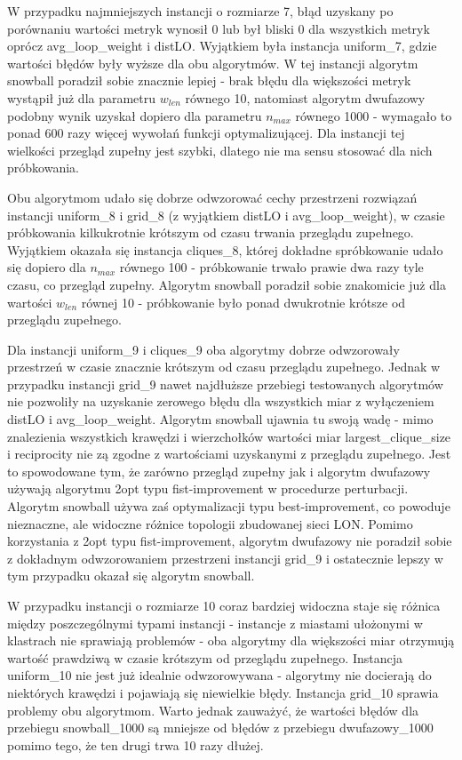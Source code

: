 W przypadku najmniejszych instancji o rozmiarze 7, błąd uzyskany po porównaniu wartości metryk
wynosił 0 lub był bliski 0 dla wszystkich metryk oprócz avg\_loop\_weight i distLO.
Wyjątkiem była instancja uniform\_7, gdzie wartości błędów były wyższe dla obu algorytmów.
W tej instancji algorytm snowball poradził sobie znacznie lepiej - brak błędu dla większości
metryk wystąpił już dla parametru $w_{len}$ równego 10, natomiast algorytm dwufazowy
podobny wynik uzyskał dopiero dla parametru $n_{max}$ równego 1000 - wymagało to ponad 600 razy więcej wywołań funkcji optymalizującej.
Dla instancji tej wielkości przegląd zupełny jest szybki, dlatego nie ma sensu stosować dla nich próbkowania.

Obu algorytmom udało się dobrze odwzorować cechy przestrzeni rozwiązań instancji uniform\_8 i grid\_8 (z wyjątkiem distLO i avg\_loop\_weight),
w czasie próbkowania kilkukrotnie krótszym od czasu trwania przeglądu zupełnego. Wyjątkiem okazała się instancja cliques\_8, której dokładne spróbkowanie
udało się dopiero dla $n_{max}$ równego 100 - próbkowanie trwało prawie dwa razy tyle czasu, co przegląd zupełny.
Algorytm snowball poradził sobie znakomicie już dla wartości $w_{len}$ równej 10 - próbkowanie było ponad dwukrotnie krótsze od przeglądu zupełnego.

Dla instancji uniform\_9 i cliques\_9 oba algorytmy dobrze odwzorowały przestrzeń w czasie znacznie krótszym od czasu przeglądu zupełnego.
Jednak w przypadku instancji grid\_9 nawet najdłuższe przebiegi testowanych algorytmów nie pozwoliły na uzyskanie zerowego błędu dla wszystkich
miar z wyłączeniem distLO i avg\_loop\_weight.
Algorytm snowball ujawnia tu swoją wadę - mimo znalezienia wszystkich krawędzi i wierzchołków wartości miar largest\_clique\_size i reciprocity
nie zą zgodne z wartościami uzyskanymi z przeglądu zupełnego. Jest to spowodowane tym, że zarówno przegląd zupełny jak i algorytm dwufazowy używają
algorytmu 2opt typu fist-improvement w procedurze perturbacji. Algorytm snowball używa zaś optymalizacji typu best-improvement, co powoduje nieznaczne,
ale widoczne różnice topologii zbudowanej sieci LON.
Pomimo korzystania z 2opt typu fist-improvement, algorytm dwufazowy nie poradził sobie z dokładnym odwzorowaniem przestrzeni instancji grid\_9 i ostatecznie
lepszy w tym przypadku okazał się algorytm snowball.

W przypadku instancji o rozmiarze 10 coraz bardziej widoczna staje się różnica między poszczególnymi typami instancji - instancje z miastami
ułożonymi w klastrach nie sprawiają problemów - oba algorytmy dla większości miar otrzymują wartość prawdziwą w czasie krótszym od przeglądu zupełnego.
Instancja uniform\_10 nie jest już idealnie odwzorowywana - algorytmy nie docierają do niektórych krawędzi i pojawiają się niewielkie błędy.
Instancja grid\_10 sprawia problemy obu algorytmom. Warto jednak zauważyć, że wartości błędów dla przebiegu snowball\_1000 są mniejsze od błędów
z przebiegu dwufazowy\_1000 pomimo tego, że ten drugi trwa 10 razy dłużej.

